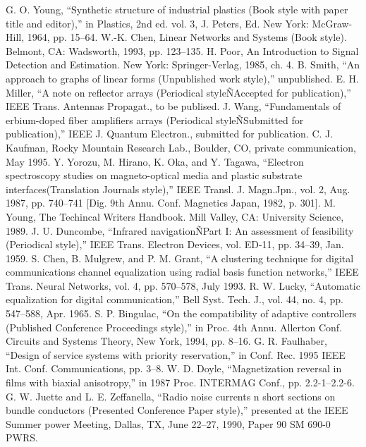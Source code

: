 \documentclass[letterpaper, 10 pt, conference]{ieeeconf}  %
\begin{document}
\begin{thebibliography}{99}

 G. O. Young, ``Synthetic structure of industrial plastics (Book style with paper title and editor),'' 	in Plastics, 2nd ed. vol. 3, J. Peters, Ed.  New York: McGraw-Hill, 1964, pp. 15--64.
 W.-K. Chen, Linear Networks and Systems (Book style).	Belmont, CA: Wadsworth, 1993, pp. 123--135.
 H. Poor, An Introduction to Signal Detection and Estimation.   New York: Springer-Verlag, 1985, ch. 4.
 B. Smith, ``An approach to graphs of linear forms (Unpublished work style),'' unpublished.
 E. H. Miller, ``A note on reflector arrays (Periodical styleÑAccepted for publication),'' IEEE Trans. Antennas Propagat., to be publised.
 J. Wang, ``Fundamentals of erbium-doped fiber amplifiers arrays (Periodical styleÑSubmitted for publication),'' IEEE J. Quantum Electron., submitted for publication.
 C. J. Kaufman, Rocky Mountain Research Lab., Boulder, CO, private communication, May 1995.
 Y. Yorozu, M. Hirano, K. Oka, and Y. Tagawa, ``Electron spectroscopy studies on magneto-optical media and plastic substrate interfaces(Translation Journals style),'' IEEE Transl. J. Magn.Jpn., vol. 2, Aug. 1987, pp. 740--741 [Dig. 9th Annu. Conf. Magnetics Japan, 1982, p. 301].
 M. Young, The Techincal Writers Handbook.  Mill Valley, CA: University Science, 1989.
 J. U. Duncombe, ``Infrared navigationÑPart I: An assessment of feasibility (Periodical style),'' IEEE Trans. Electron Devices, vol. ED-11, pp. 34--39, Jan. 1959.
 S. Chen, B. Mulgrew, and P. M. Grant, ``A clustering technique for digital communications channel equalization using radial basis function networks,'' IEEE Trans. Neural Networks, vol. 4, pp. 570--578, July 1993.
 R. W. Lucky, ``Automatic equalization for digital communication,'' Bell Syst. Tech. J., vol. 44, no. 4, pp. 547--588, Apr. 1965.
 S. P. Bingulac, ``On the compatibility of adaptive controllers (Published Conference Proceedings style),'' in Proc. 4th Annu. Allerton Conf. Circuits and Systems Theory, New York, 1994, pp. 8--16.
 G. R. Faulhaber, ``Design of service systems with priority reservation,'' in Conf. Rec. 1995 IEEE Int. Conf. Communications, pp. 3--8.
 W. D. Doyle, ``Magnetization reversal in films with biaxial anisotropy,'' in 1987 Proc. INTERMAG Conf., pp. 2.2-1--2.2-6.
 G. W. Juette and L. E. Zeffanella, ``Radio noise currents n short sections on bundle conductors (Presented Conference Paper style),'' presented at the IEEE Summer power Meeting, Dallas, TX, June 22--27, 1990, Paper 90 SM 690-0 PWRS.

\end{thebibliography}
\end{document}

